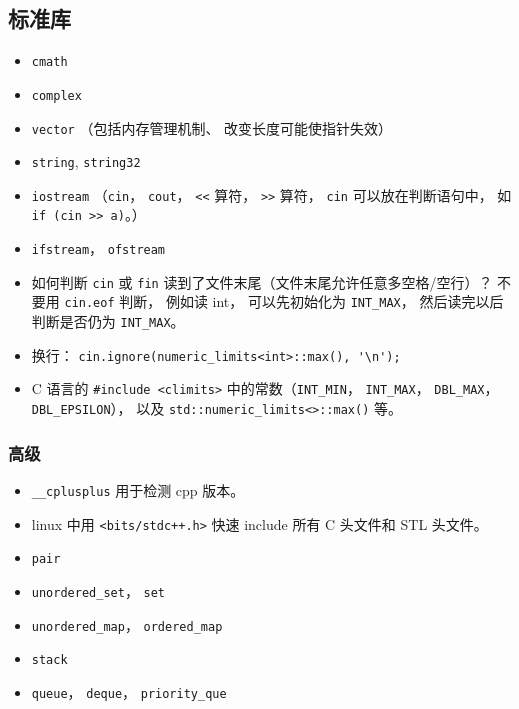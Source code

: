 \subsection{标准库}
\begin{itemize}
\item \verb|cmath|
\item \verb|complex|
\item \verb|vector| （包括内存管理机制、 改变长度可能使指针失效）
\item \verb|string|, \verb|string32|
\item \verb|iostream| （\verb|cin|， \verb|cout|， \verb|<<| 算符， \verb|>>| 算符， \verb|cin| 可以放在判断语句中， 如 \verb|if (cin >> a)|。）
\item \verb|ifstream|， \verb|ofstream|
\item 如何判断 \verb|cin| 或 \verb|fin| 读到了文件末尾（文件末尾允许任意多空格/空行）？ 不要用 \verb|cin.eof| 判断， 例如读 int， 可以先初始化为 \verb|INT_MAX|， 然后读完以后判断是否仍为 \verb|INT_MAX|。
\item 换行： \verb|cin.ignore(numeric_limits<int>::max(), '\n');|
\item C 语言的 \verb|#include <climits>| 中的常数（\verb|INT_MIN|， \verb|INT_MAX|， \verb|DBL_MAX|， \verb|DBL_EPSILON|）， 以及 \verb|std::numeric_limits<>::max()| 等。
\end{itemize}

\subsubsection{高级}
\begin{itemize}
\item \verb|__cplusplus| 用于检测 cpp 版本。
\item linux 中用 \verb|<bits/stdc++.h>| 快速 include 所有 C 头文件和 STL 头文件。
\item \verb|pair|
\item \verb|unordered_set|， \verb|set|
\item \verb|unordered_map|， \verb|ordered_map|
\item \verb|stack|
\item \verb|queue|， \verb|deque|， \verb|priority_que|
\end{itemize}

